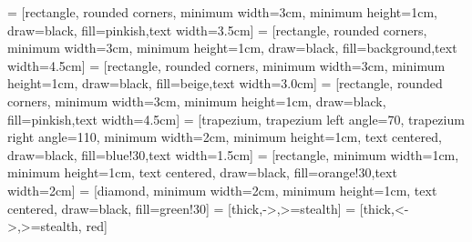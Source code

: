 \usetikzlibrary{shapes.geometric, arrows,shapes.symbols,decorations.pathreplacing}
 = [rectangle, rounded corners, minimum width=3cm, minimum height=1cm, draw=black, fill=pinkish,text width=3.5cm]
 = [rectangle, rounded corners, minimum width=3cm, minimum height=1cm, draw=black, fill=background,text width=4.5cm]
 = [rectangle, rounded corners, minimum width=3cm, minimum height=1cm, draw=black, fill=beige,text width=3.0cm]
 = [rectangle, rounded corners, minimum width=3cm, minimum height=1cm, draw=black, fill=pinkish,text width=4.5cm]
 = [trapezium, trapezium left angle=70, trapezium right angle=110, minimum width=2cm, minimum height=1cm, text centered, draw=black, fill=blue!30,text width=1.5cm]
 = [rectangle, minimum width=1cm, minimum height=1cm, text centered, draw=black, fill=orange!30,text width=2cm]
 = [diamond, minimum width=2cm, minimum height=1cm, text centered, draw=black, fill=green!30]
 = [thick,->,>=stealth]
 = [thick,<->,>=stealth, red]


\usepackage{array}
\usepackage{ctable}
\usepackage[utf8]{inputenc}
\usepackage{fontenc}
\usepackage{pifont}%
\newcommand{\cmark}{\ding{51}}%
\newcommand{\xmark}{\ding{55}}%
\def\widebar#1{\overline{#1}}

\usepackage{amssymb}
\usepackage{amsmath}

\usepackage{bm}
\def\transpose{{\sf{T}}}
\def\E{{\skew0\bm{E}}}
\def\Xvec{{\skew0\bm{X}}}
\def\Xveca{{\skew0\bm{X}}_1}
\def\Xvecb{{\skew0\bm{X}}_2}

\def\Yvec{{\skew0\bm{Y}}}
\def\bmY{{\skew0\bm{Y}}}
\def\bmX{{\skew0\bm{X}}}
\def\bmy{{\skew0\bm{y}}}
\def\bmG{{\skew0\bm{G}}}
\def\bmS{{\skew0\bm{S}}}
\def\bmA{{\skew0\bm{A}}}
\def\bmB{{\skew0\bm{B}}}
\def\bmD{{\skew0\bm{D}}}
\def\bmI{{\skew0\bm{I}}}
\def\bmV{{\skew0\bm{V}}}
\def\bmU{{\skew0\bm{U}}}
\def\bv{{\skew0\bm{v}}}
\def\bw{{\skew0\bm{w}}}
\def\bmm{{\skew0\bm{m}}}
\def\bmzero{{\skew0\bm{0}}}
\def\bx{{\skew0\bm{x}}}
\def\xveca{{\skew0\bm{x}}_1}
\def\xvecb{{\skew0\bm{x}}_2}

\def\N{{\skew0\mathcal{N}}}
\def\T{{\small T}}

\def\mvec{{\skew0\bm{m}}}
\def\bmmu{{\skew0\bm{\mu}}}
\def\muvec{{\skew0\bm{\mu}}}
\def\balpha{{\skew0\bm{\alpha}}}
\def\bbeta{{\skew0\bm{\beta}}}
\def\bmtheta{{\skew0\bm{\theta}}}
\def\btheta{{\skew0\bm{\theta}}}

